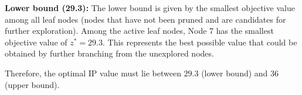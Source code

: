 \documentclass{article}
\begin{document}
\begin{enumerate}
\begin{enumerate}
\textbf{Lower bound (29.3):} The lower bound is given by the smallest objective value among all leaf nodes (nodes that have not been pruned and are candidates for further exploration). Among the active leaf nodes, Node 7 has the smallest objective value of $z^* = 29.3$. This represents the best possible value that could be obtained by further branching from the unexplored nodes.

Therefore, the optimal IP value must lie between $29.3$ (lower bound) and $36$ (upper bound).

\end{enumerate}
 
\end{enumerate}
\end{document}
